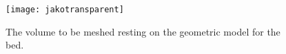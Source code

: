 \begin{figure}
  \centering\texttt{[image: jakotransparent]}
  \caption{The volume to be meshed resting on the geometric model for the bed.}\label{fig:jakotransparent}
\end{figure}


%
%
%
%

% 
